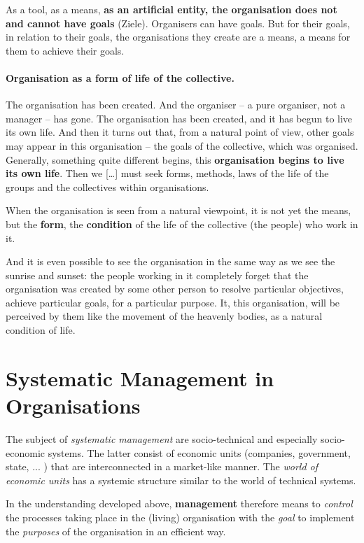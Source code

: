 \documentclass[11pt,a4paper]{article}
\begin{document}
As a tool, as a means, \textbf{as an artificial entity, the organisation does
  not and cannot have goals} (Ziele). Organisers can have goals. But for their
goals, in relation to their goals, the organisations they create are a means,
a means for them to achieve their goals.

\paragraph{Organisation as a form of life of the collective.}
\cite[p. 30]{MSM} The organisation has been created. And the organiser – a
pure organiser, not a manager – has gone. The organisation has been created,
and it has begun to live its own life. And then it turns out that, from a
natural point of view, other goals may appear in this organisation – the goals
of the collective, which was organised. Generally, something quite different
begins, this \textbf{organisation begins to live its own life}. Then we
[\ldots] must seek forms, methods, laws of the life of the groups and the
collectives within organisations.

When the organisation is seen from a natural viewpoint, it is not yet the
means, but the \textbf{form}, the \textbf{condition} of the life of the
collective (the people) who work in it.

And it is even possible to see the organisation in the same way as we see the
sunrise and sunset: the people working in it completely forget that the
organisation was created by some other person to resolve particular
objectives, achieve particular goals, for a particular purpose. It, this
organisation, will be perceived by them like the movement of the heavenly
bodies, as a natural condition of life.

\section{Systematic Management in Organisations}

The subject of \emph{systematic management} are socio-technical and especially
socio-economic systems. The latter consist of economic units (companies,
government, state, ... ) that are interconnected in a market-like manner. The
\emph{world of economic units} has a systemic structure similar to the world
of technical systems.

In the understanding developed above, \textbf{management} therefore means to
\emph{control} the processes taking place in the (living) organisation with
the \emph{goal} to implement the \emph{purposes} of the organisation in an
efficient way.
\end{document}
